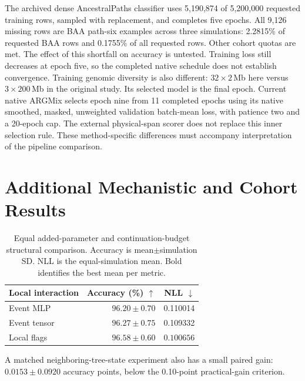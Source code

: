 \documentclass[letterpaper]{article}
\newcommand{\best}[1]{\mathbf{#1}}
\begin{document}
The archived dense AncestralPaths classifier uses 5,190,874 of 5,200,000 requested training rows, sampled with replacement, and completes five epochs. All 9,126 missing rows are BAA path-six examples across three simulations: 2.2815\% of requested BAA rows and 0.1755\% of all requested rows. Other cohort quotas are met. The effect of this shortfall on accuracy is untested. Training loss still decreases at epoch five, so the completed native schedule does not establish convergence. Training genomic diversity is also different: $32\times2$\,Mb here versus $3\times200$\,Mb in the original study. Its selected model is the final epoch. Current native ARGMix selects epoch nine from 11 completed epochs using its native smoothed, masked, unweighted validation batch-mean loss, with patience two and a 20-epoch cap. The external physical-span scorer does not replace this inner selection rule. These method-specific differences must accompany interpretation of the pipeline comparison.

\section{Additional Mechanistic and Cohort Results}
\begin{table}[t]
\centering
\small
\begin{tabular}{@{}lrr@{}}
\toprule
Local interaction & Accuracy (\%) $\uparrow$ & NLL $\downarrow$\\
\midrule
Event MLP & $96.20\pm0.70$ &0.110014\\
Event tensor & $96.27\pm0.75$ &0.109332\\
Local flags & $\best{96.58\pm0.60}$ &$\best{0.100656}$\\
\bottomrule
\end{tabular}
\caption{Equal added-parameter and continuation-budget structural comparison. Accuracy is mean$\pm$simulation SD. NLL is the equal-simulation mean. Bold identifies the best mean per metric.}
\label{tab:interactions}
\end{table}

A matched neighboring-tree-state experiment also has a small paired gain: $0.0153\pm0.0920$ accuracy points, below the 0.10-point practical-gain criterion.
\end{document}
